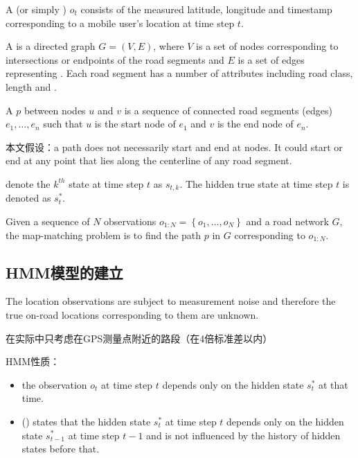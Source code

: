 A  (or simply ) $ o_{t} $ consists of the measured latitude, longitude and timestamp corresponding to a mobile user's location at time step $ t $. 

A  is a directed graph $ G=(V, E) $, where $ V $ is a set of nodes corresponding to intersections or endpoints of the road segments and $ E $ is a set of edges representing . Each road segment has a number of attributes including road class, length and .

A  $ p $ between nodes $ u $ and $ v $ is a sequence of connected road segments (edges) $ e_{1}, \ldots, e_{n} $ such that $ u $ is the start node of $ e_{1} $ and $ v $ is the end node of $ e_{n} $. 

\begin{remark}
   本文假设：a path does not necessarily start and end at nodes. It could start or end at any point that lies along the centerline of any road segment.  
\end{remark}

denote the $ k^{t h} $ state at time step $ t $ as $ s_{t, k} . $ The hidden true state at time step $ t $ is denoted as $ s_{t}^{*} $.

Given a sequence of $ N $ observations $ o_{1: N}=\left\{o_{1}, \ldots, o_{N}\right\} $ and a road network $ G $, the map-matching problem is to find the path $ p $ in $ G $ corresponding to $ o_{1: N} $.

\subsection{HMM模型的建立}
The location observations are subject to measurement noise
and therefore the true on-road locations corresponding to them
are unknown.

在实际中只考虑在GPS测量点附近的路段（在4倍标准差以内）

HMM性质：
\begin{itemize}
    \item the observation $ o_{t} $ at time step $ t $ depends only on the hidden state $ s_{t}^{*} $ at that time.
    \item () states that the hidden state $ s_{t}^{*} $ at time step $ t $ depends only on the hidden state $ s_{t-1}^{*} $ at time step $ t-1 $ and is not influenced by the history of hidden states before that.
\end{itemize}

